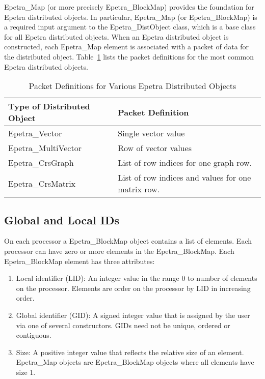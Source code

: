 \documentclass[12pt,relax]{EpetraUserGuide}
\newcommand{\map}{Epetra\_Map}
\newcommand{\blockmap}{Epetra\_BlockMap}
\renewcommand{\vector}{Epetra\_Vector}
\newcommand{\multivector}{Epetra\_MultiVector}
\newcommand{\crsgraph}{Epetra\_CrsGraph}
\newcommand{\crsmatrix}{Epetra\_CrsMatrix}
\newcommand{\distobject}{Epetra\_DistObject}
\begin{document}
\map{} (or more precisely \blockmap{}) provides the foundation for Epetra
distributed objects.  In particular, \map{} (or \blockmap{}) is a required
input argument to the \distobject{} class, which is a base class for all Epetra
distributed objects.  When an Epetra distributed object is constructed, each \map{}
element is associated with a packet of data for the distributed object.
Table~\ref{Table:PacketDefinitions} lists the packet definitions for the most
common Epetra distributed objects.
\begin{table}
\begin{center}
\begin{tabular}{ | p{7.5cm} | p{7.5cm} | }
\hline\hline
Type of Distributed Object & Packet Definition \\\hline
\vector{} & Single vector value \\\hline
\multivector{} & Row of vector values \\\hline
\crsgraph{} & List of row indices for one graph row. \\\hline
\crsmatrix{} & List of row indices and values for one matrix row. \\\hline
\hline
\end{tabular}
\caption{Packet Definitions for Various Epetra Distributed Objects}
\label{Table:PacketDefinitions}
\end{center}
\end{table}


\subsection{Global and Local IDs}

On each processor a \blockmap{} object contains a list of elements.  Each
processor can have zero or more elements in the \blockmap.  Each \blockmap{}
element has three attributes:
\begin{enumerate}
\item Local identifier (LID): An integer value in the range 0 to number of elements
on the processor. Elements are order on the processor by LID in increasing order.
\item Global identifier (GID): A signed integer value that is assigned by the user via
one of several constructors.  GIDs need not be unique, ordered or contiguous.
\item Size: A positive integer value that reflects the relative size of an element.  \map{}
objects are \blockmap{} objects where all elements have size 1.
\end{enumerate}
\end{document}
